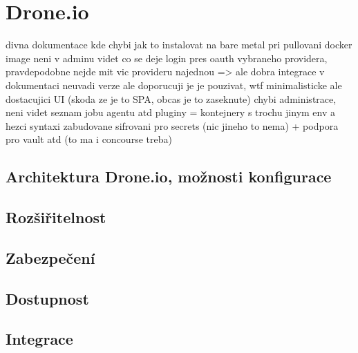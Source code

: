 \section{Drone.io}

    divna dokumentace kde chybi jak to instalovat na bare metal
    pri pullovani docker image neni v adminu videt co se deje
    login pres oauth vybraneho providera, pravdepodobne nejde mit vic provideru najednou => ale dobra integrace
    v dokumentaci neuvadi verze ale doporucuji je je pouzivat, wtf
    minimalisticke ale dostacujici UI (skoda ze je to SPA, obcas je to zaseknute)
    chybi administrace, neni videt seznam jobu agentu atd
    pluginy = kontejnery s trochu jinym env a hezci syntaxi
    zabudovane sifrovani pro secrets (nic jineho to nema) + podpora pro vault atd (to ma i concourse treba)

    \subsection{Architektura Drone.io, možnosti konfigurace}
        \blind[4]

    \subsection{Rozšiřitelnost}
        \blind[3]

    \subsection{Zabezpečení}
        \blind[3]

    \subsection{Dostupnost}
        \blind[3]

    \subsection{Integrace}
        \blind[2]
        \blind[2]

